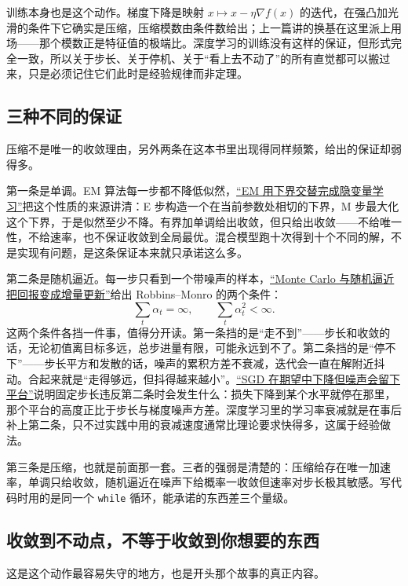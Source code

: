 训练本身也是这个动作。梯度下降是映射 \(x\mapsto x-\eta\nabla f(x)\) 的迭代，在强凸加光滑的条件下它确实是压缩，压缩模数由条件数给出；上一篇讲的换基在这里派上用场——那个模数正是特征值的极端比。深度学习的训练没有这样的保证，但形式完全一致，所以关于步长、关于停机、关于``看上去不动了''的所有直觉都可以搬过来，只是必须记住它们此时是经验规律而非定理。

\subsection{三种不同的保证}

压缩不是唯一的收敛理由，另外两条在这本书里出现得同样频繁，给出的保证却弱得多。

第一条是单调。EM 算法每一步都不降低似然，\hyperref[sec:13-Machine-Learning/06-Probabilistic-Models/04]{``EM 用下界交替完成隐变量学习''}把这个性质的来源讲清：E 步构造一个在当前参数处相切的下界，M 步最大化这个下界，于是似然至少不降。有界加单调给出收敛，但只给出收敛——不给唯一性，不给速率，也不保证收敛到全局最优。混合模型跑十次得到十个不同的解，不是实现有问题，是这条保证本来就只承诺这么多。

第二条是随机逼近。每一步只看到一个带噪声的样本，\hyperref[sec:16-Control-and-Reinforcement-Learning/02-Reinforcement-Learning/03]{``Monte Carlo 与随机逼近把回报变成增量更新''}给出 Robbins--Monro 的两个条件：
\[
  \sum_{t} \alpha_t = \infty, \qquad \sum_{t} \alpha_t^{2} < \infty .
\]
这两个条件各挡一件事，值得分开读。第一条挡的是``走不到''——步长和收敛的话，无论初值离目标多远，总步进量有限，可能永远到不了。第二条挡的是``停不下''——步长平方和发散的话，噪声的累积方差不衰减，迭代会一直在解附近抖动。合起来就是``走得够远，但抖得越来越小''。\hyperref[sec:09-Convex-Optimization/08-Nonconvex-and-Stochastic-Optimization/04]{``SGD 在期望中下降但噪声会留下平台''}说明固定步长违反第二条时会发生什么：损失下降到某个水平就停在那里，那个平台的高度正比于步长与梯度噪声方差。深度学习里的学习率衰减就是在事后补上第二条，只不过实践中用的衰减速度通常比理论要求快得多，这属于经验做法。

第三条是压缩，也就是前面那一套。三者的强弱是清楚的：压缩给存在唯一加速率，单调只给收敛，随机逼近在噪声下给概率一收敛但速率对步长极其敏感。写代码时用的是同一个 \texttt{while} 循环，能承诺的东西差三个量级。

\subsection{收敛到不动点，不等于收敛到你想要的东西}

这是这个动作最容易失守的地方，也是开头那个故事的真正内容。

